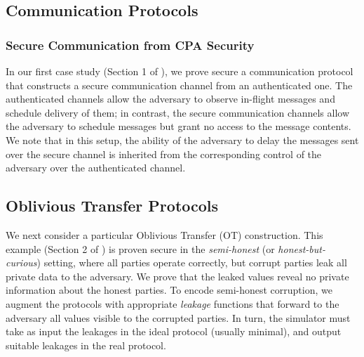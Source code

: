 \documentclass[11pt,hidelinks]{article}
\newcommand{\ipdl}{\textsf{IPDL} }
\begin{document}

\subsection{Communication Protocols}

\subsubsection{Secure Communication from CPA Security}
In our first case study (Section 1 of \cite{case_studies}), we prove secure a communication protocol that constructs a secure communication channel from an authenticated one. The authenticated channels allow the adversary to observe in-flight messages and schedule delivery of them; in contrast, the secure communication channels allow the adversary to schedule messages but grant no access to the message contents. We note that in this setup, the ability of the adversary to delay the messages sent over the secure channel is inherited from the corresponding control of the adversary over the authenticated channel.


\subsection{Oblivious Transfer Protocols}
We next consider a particular Oblivious Transfer (OT) construction. This example (Section 2 of \cite{case_studies}) is proven secure in the \emph{semi-honest} (or \emph{honest-but-curious}) setting, where all parties operate correctly, but corrupt parties leak all private data to the adversary. We prove that the leaked values reveal no private information about the honest parties. To encode semi-honest corruption, we augment the protocols with appropriate \emph{leakage} functions that forward to the adversary all values visible to the corrupted parties. In turn, the simulator must take as input the leakages in the ideal protocol
(usually minimal), and output suitable leakages in the real protocol.
\end{document}

